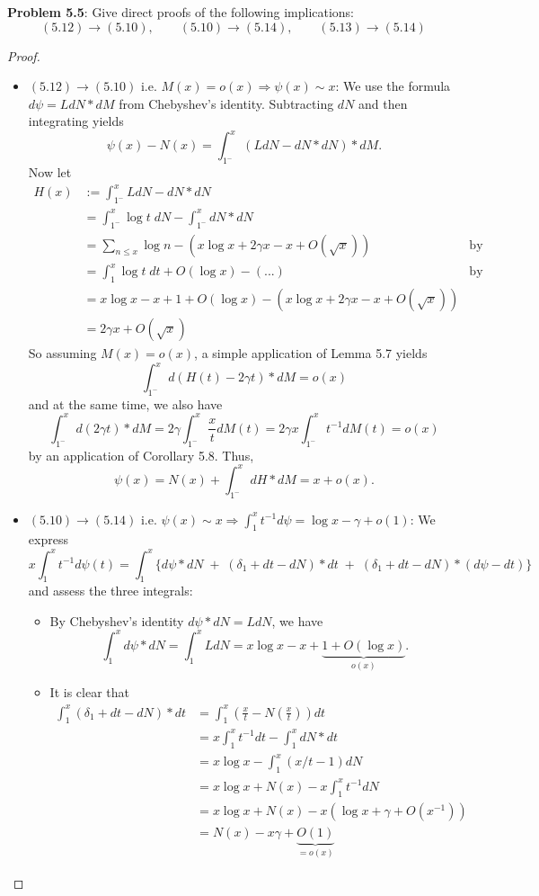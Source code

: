 \documentclass[12pt]{article}
\begin{document}
\fi

\textbf{Problem 5.5}: Give direct proofs of the following implications:
$$(5.12) \longrightarrow (5.10), \qquad (5.10) \longrightarrow (5.14), \qquad (5.13) \longrightarrow (5.14)$$

\begin{proof}
\begin{itemize}
\item $(5.12) \longrightarrow (5.10)$ i.e. $M(x) = o(x) \Rightarrow \psi(x) \sim x$: We use the formula $d\psi = LdN * dM$ from Chebyshev's identity. Subtracting $dN$ and then integrating yields
$$\psi(x) - N(x) = \int_{1^-}^x (LdN - dN * dN) * dM.$$
Now let
\begin{align*}
H(x) &:= \int_{1^-}^x LdN - dN * dN\\
&= \int_{1^-}^x \log t \; dN - \int_{1^-}^x dN * dN\\
&= \sum_{n \leq x} \log n - (x \log x + 2\gamma x - x + O(\sqrt x)) &\text{by Corollary 3.32}\\
&= \int_1^x \log t \; dt + O(\log x) - (...) &\text{by problem 3.13}\\
&= x \log x - x + 1 + O(\log x) - (x \log x + 2\gamma x - x + O(\sqrt x))\\
&= 2 \gamma x + O(\sqrt x)
\end{align*}
So assuming $M(x) = o(x)$, a simple application of Lemma 5.7 yields
$$\int_{1^-}^x d(H(t) - 2\gamma t) * dM = o(x)$$
and at the same time, we also have
$$\int_{1^-}^x d(2\gamma t) * dM = 2 \gamma \int_{1^-}^x \frac{x}{t} dM(t) = 2 \gamma x \int_{1^-}^x t^{-1} dM(t) = o(x)$$
by an application of Corollary 5.8. Thus,
$$\psi(x) = N(x) + \int_{1^-}^x dH * dM = x + o(x).$$

\item $(5.10) \longrightarrow (5.14)$ i.e. $\psi(x) \sim x \Rightarrow \int_1^x t^{-1} d\psi = \log x - \gamma + o(1)$: We express
$$x \int_1^x t^{-1} d\psi(t) = \int_1^x \{ d\psi * dN \;+\; (\delta_1 + dt - dN) * dt \;+\; (\delta_1 + dt - dN) * (d\psi - dt) \}$$
and assess the three integrals:
\begin{itemize}
\item By Chebyshev's identity $d\psi * dN = L dN$, we have
$$\int_1^x d\psi * dN = \int_1^x L dN = x \log x - x + \underbrace{1 + O(\log x)}_{o(x)}.$$

\item It is clear that
\begin{align*}
\int_1^x (\delta_1 + dt - dN) * dt &= \int_1^x \left( \frac{x}{t} - N\left(\frac{x}{t}\right) \right) dt\\
&= x \int_1^x t^{-1} dt - \int_1^x dN * dt\\
&= x \log x - \int_1^x (x/t - 1) dN\\
&= x \log x + N(x) - x \int_1^x t^{-1} dN\\
&= x \log x + N(x) - x (\log x + \gamma + O(x^{-1}))\\
&= N(x) - x \gamma + \underbrace{O(1)}_{= o(x)}
\end{align*}


\end{itemize}
\end{itemize}
\end{proof}
\end{document}
